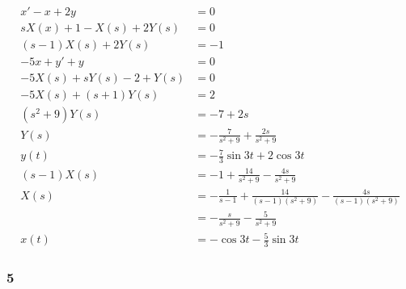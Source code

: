 \documentclass{article}
\begin{document}
\begin{align*}
  x' - x + 2 y                & = 0                                                                               \\
  s X(x) + 1 - X(s) + 2 Y(s)  & = 0                                                                               \\
  (s - 1) X(s) + 2 Y(s)       & = -1                                                                              \\
  -5 x + y' + y               & = 0                                                                               \\
  -5 X(s) + s Y(s) - 2 + Y(s) & = 0                                                                               \\
  -5 X(s) + (s + 1) Y(s)      & = 2                                                                               \\
  (s^2 + 9) Y(s)              & = -7 + 2 s                                                                        \\
  Y(s)                        & = -\frac{7}{s^2 + 9} + \frac{2 s}{s^2 + 9}                                        \\
  y(t)                        & = -\frac{7}{3} \sin 3 t + 2 \cos 3 t                                              \\
  (s - 1) X(s)                & = -1 + \frac{14}{s^2 + 9} - \frac{4 s}{s^2 + 9}                                   \\
  X(s)                        & = -\frac{1}{s - 1} + \frac{14}{(s - 1) (s^2 + 9)} - \frac{4 s}{(s - 1) (s^2 + 9)} \\
                              & = - \frac{s}{s^2 + 9} - \frac{5}{s^2 + 9}                                         \\
  x(t)                        & = -\cos 3 t - \frac{5}{3} \sin 3 t
\end{align*}

\subsubsection{5}
\end{document}
